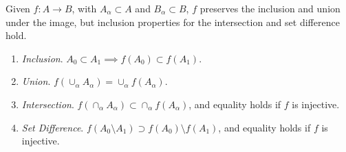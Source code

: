   \begin{theorem}
    \label{preserve_image}
    Given $f: A \rightarrow B$, with $A_\alpha \subset A$ and $B_\alpha \subset B$, $f$ preserves the inclusion and union under the image, but inclusion properties for the intersection and set difference hold. 
    \begin{enumerate}
      \item \textit{Inclusion}. $A_0 \subset A_1 \implies f(A_0) \subset f(A_1)$. 
      \item \textit{Union}. $f(\cup_\alpha A_\alpha) = \cup_\alpha f(A_\alpha)$. 
      \item \textit{Intersection}. $f(\cap_\alpha A_\alpha) \subset \cap_\alpha f(A_\alpha)$, and equality holds if $f$ is injective. 
      \item \textit{Set Difference}. $f(A_0 \setminus A_1) \supset f(A_0) \setminus f(A_1)$, and equality holds if $f$ is injective. 
    \end{enumerate}
  \end{theorem} 
